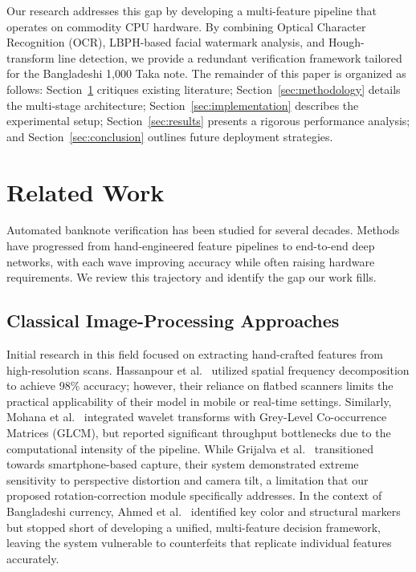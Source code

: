 \documentclass[10pt,a4paper,twocolumn,twoside]{article}
\begin{document}
Our research addresses this gap by developing a multi-feature pipeline that operates on commodity CPU hardware. By combining Optical Character Recognition (OCR), LBPH-based facial watermark analysis, and Hough-transform line detection, we provide a redundant verification framework tailored for the Bangladeshi 1,000 Taka note. The remainder of this paper is organized as follows: Section~\ref{sec:related} critiques existing literature; Section~\ref{sec:methodology} details the multi-stage architecture; Section~\ref{sec:implementation} describes the experimental setup; Section~\ref{sec:results} presents a rigorous performance analysis; and Section~\ref{sec:conclusion} outlines future deployment strategies.
\section{Related Work}
\label{sec:related}
Automated banknote verification has been studied for several decades. Methods have progressed from hand-engineered feature pipelines to end-to-end deep networks, with each wave improving accuracy while often raising hardware requirements. We review this trajectory and identify the gap our work fills.

\subsection{Classical Image-Processing Approaches}

Initial research in this field focused on extracting hand-crafted features from high-resolution scans. Hassanpour et al.~\cite{hassanpour2007} utilized spatial frequency decomposition to achieve 98\% accuracy; however, their reliance on flatbed scanners limits the practical applicability of their model in mobile or real-time settings. Similarly, Mohana et al.~\cite{mohana2019} integrated wavelet transforms with Grey-Level Co-occurrence Matrices (GLCM), but reported significant throughput bottlenecks due to the computational intensity of the pipeline. While Grijalva et al.~\cite{grijalva2010} transitioned towards smartphone-based capture, their system demonstrated extreme sensitivity to perspective distortion and camera tilt, a limitation that our proposed rotation-correction module specifically addresses. In the context of Bangladeshi currency, Ahmed et al.~\cite{ahmed2014} identified key color and structural markers but stopped short of developing a unified, multi-feature decision framework, leaving the system vulnerable to counterfeits that replicate individual features accurately.
\end{document}
